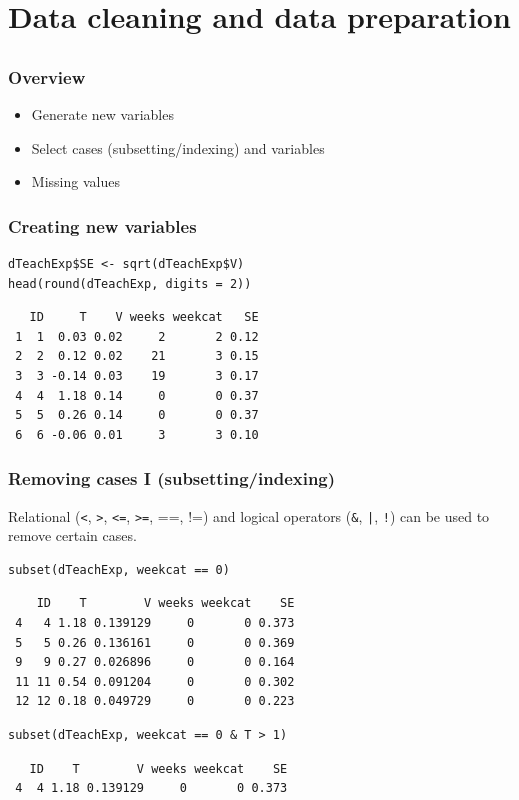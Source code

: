 \documentclass[bigger]{beamer}
\begin{document}
\section{Data cleaning and data preparation}
\label{sec-4}
\subsection{}
\begin{frame}
\frametitle{Overview}
\label{sec-4-1-1}

\begin{itemize}
\item Generate new variables
\item Select cases (subsetting/indexing) and variables
\item Missing values
\end{itemize}
\end{frame}
\begin{frame}[fragile]
\frametitle{Creating new variables}
\label{sec-4-1-2}


\lstset{language=R}
\begin{lstlisting}
dTeachExp$SE <- sqrt(dTeachExp$V)
head(round(dTeachExp, digits = 2))
\end{lstlisting}

\begin{verbatim}
   ID     T    V weeks weekcat   SE
 1  1  0.03 0.02     2       2 0.12
 2  2  0.12 0.02    21       3 0.15
 3  3 -0.14 0.03    19       3 0.17
 4  4  1.18 0.14     0       0 0.37
 5  5  0.26 0.14     0       0 0.37
 6  6 -0.06 0.01     3       3 0.10
\end{verbatim}
\end{frame}
\begin{frame}[fragile]
\frametitle{Removing cases I (subsetting/indexing)}
\label{sec-4-1-3}

    Relational (\texttt{<}, \texttt{>}, \texttt{<=}, \texttt{>=}, ==, !=) and logical operators (\texttt{\&}, \texttt{|}, \texttt{!}) can be used to remove certain cases.

\lstset{language=R}
\begin{lstlisting}
subset(dTeachExp, weekcat == 0)
\end{lstlisting}

\begin{verbatim}
    ID    T        V weeks weekcat    SE
 4   4 1.18 0.139129     0       0 0.373
 5   5 0.26 0.136161     0       0 0.369
 9   9 0.27 0.026896     0       0 0.164
 11 11 0.54 0.091204     0       0 0.302
 12 12 0.18 0.049729     0       0 0.223
\end{verbatim}



\lstset{language=R}
\begin{lstlisting}
subset(dTeachExp, weekcat == 0 & T > 1)
\end{lstlisting}

\begin{verbatim}
   ID    T        V weeks weekcat    SE
 4  4 1.18 0.139129     0       0 0.373
\end{verbatim}
\end{frame}
\end{document}
